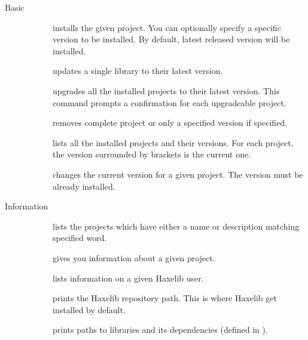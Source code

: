 \begin{description}
	\item[Basic]
		\begin{description}
			\item[] installs the given project. You can optionally specify a specific version to be installed. By default, latest released version will be installed.
			\item[] updates a single library to their latest version. 
			\item[] upgrades all the installed projects to their latest version. This command prompts a confirmation for each upgradeable project.
			\item[] removes complete project or only a specified version if specified.
			\item[] lists all the installed projects and their versions. For each project, the version surrounded by brackets is the current one.
			\item[] changes the current version for a given project. The version must be already installed.
		\end{description}
		
	\item[Information]
		\begin{description}
			\item[] lists the projects which have either a name or description matching specified word.
			\item[] gives you information about a given project.
			\item[] lists information on a given Haxelib user.
			\item[] prints the Haxelib repository path. This is where Haxelib get installed by default.
			\item[] prints paths to libraries and its dependencies (defined in ).
		\end{description}
		

\end{description}
